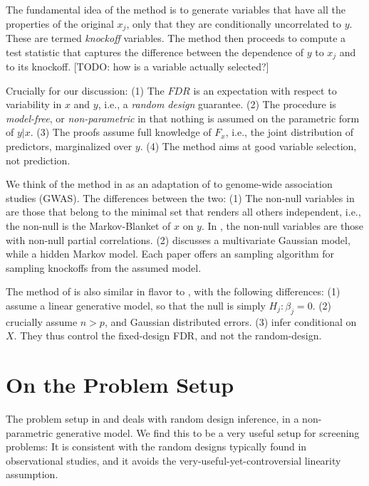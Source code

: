 \documentclass[article,lineno]{biometrika}
\begin{document}
The fundamental idea of the method is to generate variables that have all the properties of the original $x_j$, only that they are conditionally uncorrelated to $y$. 
These are termed \emph{knockoff} variables. 
The method then proceeds to compute a test statistic that captures the difference between the dependence of $y$ to $x_j$ and to its knockoff. 
[TODO: how is a variable actually selected?]

Crucially for our discussion:
(1) The $FDR$ is an expectation with respect to variability in $x$ and $y$, i.e., a \emph{random design} guarantee. 
(2) The procedure is \emph{model-free}, or \emph{non-parametric} in that nothing is assumed on the parametric form of $y|x$. 
(3) The proofs assume full knowledge of $F_x$, i.e., the joint distribution of predictors, marginalized over $y$.
(4) The method aims at good variable selection, not prediction. 

We think of the method in \cite{SesiaGenehuntinghidden} as an adaptation of \cite{CandesPanninggoldmodelX2018} to genome-wide association studies (GWAS).
The differences between the two:
(1) The non-null variables in \cite{CandesPanninggoldmodelX2018} are those that belong to the minimal set that renders all others independent, i.e., the non-null is the Markov-Blanket of $x$ on $y$. 
In \cite{SesiaGenehuntinghidden}, the non-null variables are those with non-null partial correlations. 
(2) \cite{CandesPanninggoldmodelX2018} discusses a multivariate Gaussian model, while \cite{SesiaGenehuntinghidden} a hidden Markov model. 
Each paper offers an sampling algorithm for sampling knockoffs from the assumed model. 

The method of \cite{SesiaGenehuntinghidden} is also similar in flavor to \cite{BarberControllingfalsediscovery2015}, with the following differences:
(1) \cite{BarberControllingfalsediscovery2015} assume a linear generative model, so that the null is simply $H_j:\beta_j=0$. 
(2) \cite{BarberControllingfalsediscovery2015} crucially assume $n>p$, and Gaussian distributed errors. 
(3) \cite{BarberControllingfalsediscovery2015} infer conditional on $X$. They thus control the fixed-design FDR, and not the random-design.



\section{On the Problem Setup}

The problem setup in \cite{CandesPanninggoldmodelX2018} and \cite{SesiaGenehuntinghidden} deals with random design inference, in a non-parametric generative model.
We find this to be a very useful setup for screening problems:
It is consistent with the random designs typically found in observational studies, and it avoids the very-useful-yet-controversial linearity assumption. 
\end{document}
